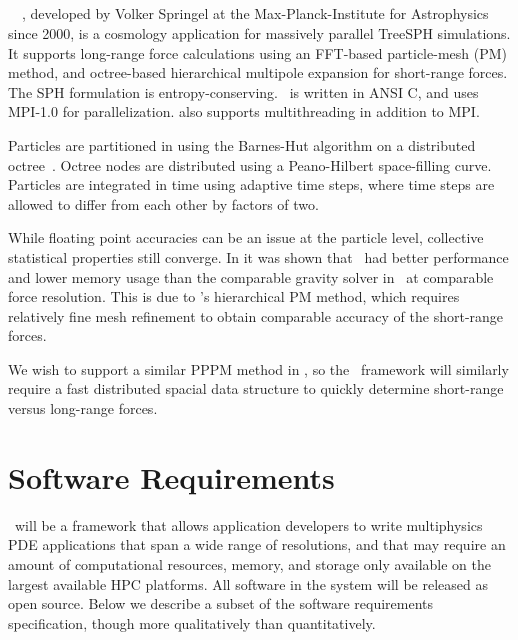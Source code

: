 \documentclass[10pt,twocolumn]{article}
\begin{document}
\subsection{\gadget } \label{ss:gadget}

\gadget~\cite{wwwgadget}~\cite{Sp05}, developed by Volker Springel at
the Max-Planck-Institute for Astrophysics since 2000, is a cosmology
application for massively parallel TreeSPH simulations.  It supports
long-range force calculations using an FFT-based particle-mesh (PM)
method, and octree-based hierarchical multipole expansion for
short-range forces.  The SPH formulation is entropy-conserving.
\gadget\ is written in ANSI C, and uses MPI-1.0 for parallelization.
 also supports multithreading in addition to MPI.

Particles are partitioned in  using the Barnes-Hut
algorithm on a distributed octree~\cite{BaHu86}.  Octree nodes are
distributed using a Peano-Hilbert space-filling curve.  Particles are
integrated in time using adaptive time steps, where time steps are
allowed to differ from each other by factors of two.

While floating point accuracies can be an issue at the particle level,
collective statistical properties still converge.  In \cite{OsNa05} it
was shown that \gadget\ had better performance and lower memory usage
than the comparable gravity solver in \enzo\ at comparable force
resolution.  This is due to \enzo's hierarchical PM method, which
requires relatively fine mesh refinement to obtain comparable accuracy
of the short-range forces.

We wish to support a similar PPPM method in \enzoii, so the \cello\
framework will similarly require a fast distributed spacial data
structure to quickly determine short-range versus long-range forces.

\section{Software Requirements} \label{s:require}


\cello\ will be a framework that allows application developers to
write multiphysics PDE applications that span a wide range of
resolutions, and that may require an amount of computational
resources, memory, and storage only available on the largest available
HPC platforms.  All software in the system will be released as open
source.  Below we describe a subset of the software requirements
specification, though more qualitatively than quantitatively.
\end{document}
